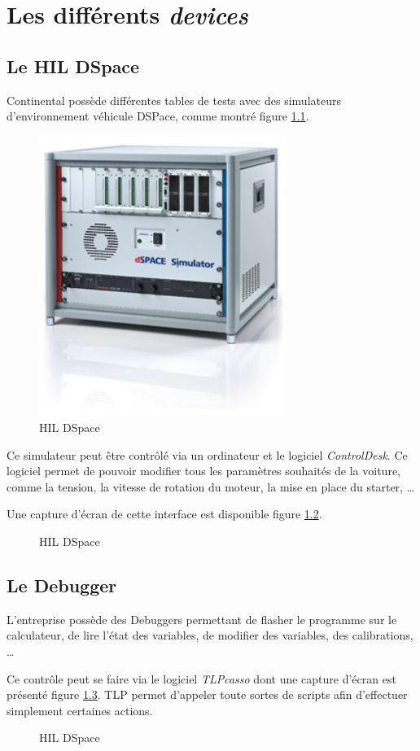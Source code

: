 \chapter{Les différents \textit{devices}}
\section{Le HIL DSpace}
Continental possède différentes tables de tests avec des simulateurs d'environnement véhicule DSPace, comme montré figure \ref{fig:dspace}.
\begin{figure}[H]
	\centering
	\includegraphics[width=8cm]{contents/images/hil.jpg}
	\caption{HIL DSpace}
	\label{fig:dspace}
\end{figure}

Ce simulateur peut être contrôlé via un ordinateur et le logiciel \textit{ControlDesk}. Ce logiciel permet de pouvoir modifier tous les
paramètres souhaités de la voiture, comme la tension, la vitesse de rotation du moteur, la mise en place du starter, \ldots

Une capture d'écran de cette interface est disponible figure \ref{fig:controldesk}.

\begin{figure}[H]
	\centering
	\caption{HIL DSpace}
	\label{fig:controldesk}
\end{figure}

\section{Le Debugger}
L'entreprise possède des Debuggers permettant de flasher le programme sur le calculateur, de lire l'état des variables, de modifier des
variables, des calibrations, \ldots

Ce contrôle peut se faire via le logiciel \textit{TLPcasso} dont une capture d'écran est présenté figure \ref{fig:tlp}. TLP permet d'appeler
toute sortes de scripts afin d'effectuer simplement certaines actions.

\begin{figure}[H]
	\centering
	\caption{HIL DSpace}
	\label{fig:tlp}
\end{figure}
